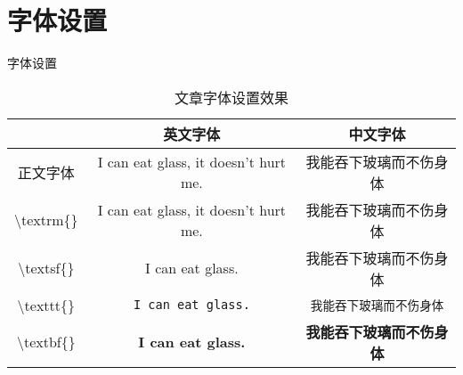 \section{字体设置}
字体设置
\begin{table}[htb]
	\caption{文章字体设置效果}
	\label{tab:文章字体设置效果}
	\begin{center}
		\begin{tabular}{ccc}
			\toprule
					& 英文字体 & 中文字体  \\
			\midrule
			正文字体 & I can eat glass, it doesn't hurt me. & 我能吞下玻璃而不伤身体 \\
			\textbackslash textrm\{\} & \textrm{I can eat glass, it doesn't hurt me.} & \textrm{我能吞下玻璃而不伤身体} \\
			\textbackslash textsf\{\} & \textsf{I can eat glass.} & \textsf{我能吞下玻璃而不伤身体} \\
			\textbackslash texttt\{\} & \texttt{I can eat glass.} & \texttt{我能吞下玻璃而不伤身体} \\
			\textbackslash textbf\{\} & \textbf{I can eat glass.} & \textbf{我能吞下玻璃而不伤身体} \\
			\bottomrule
		\end{tabular}
	\end{center}
\end{table}

